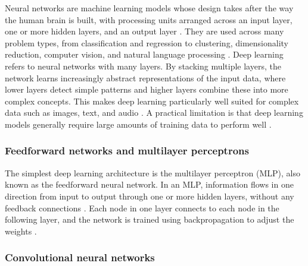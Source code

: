 Neural networks are machine learning models whose design takes after the way the 
human brain is built, with processing units arranged across an input 
layer, one or more hidden layers, and an output layer
\parencite{shrestha2019review_deep_learning_algorithms_architectures}. 
They are used across many problem types, from classification and 
regression to clustering, dimensionality reduction, computer vision, 
and natural language processing
\parencite{shrestha2019review_deep_learning_algorithms_architectures}.
Deep learning refers to neural networks with many layers. By stacking 
multiple layers, the network learns increasingly abstract representations 
of the input data, where lower layers detect simple patterns and higher 
layers combine these into more complex concepts.
This makes deep learning particularly well suited for complex 
data such as images, text, and audio
\parencite{lecun2015deep_learning}. 
A practical limitation is that deep learning models generally require 
large amounts of training data to perform well 
\parencite{alzubaidi2021review_deep_learning_concepts}.

\subsubsection*{Feedforward networks and multilayer perceptrons}

The simplest deep learning architecture is the multilayer perceptron (MLP), 
also known as the feedforward neural network. In an MLP, information flows 
in one direction from input to output through one or more hidden layers, 
without any feedback connections 
\parencite{shrestha2019review_deep_learning_algorithms_architectures, 
sarker2021machine_learning_algorithms_real_world_applications_research_directions}. 
Each node in one layer connects to each node in the following layer, and 
the network is trained using backpropagation to adjust the weights 
\parencite{lecun2015deep_learning}.

\subsubsection*{Convolutional neural networks}

